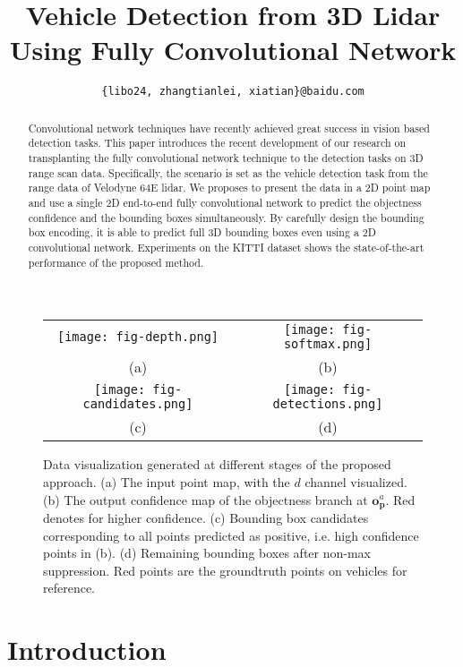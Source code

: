 \documentclass[conference]{IEEEtran}
\title{Vehicle Detection from 3D Lidar Using Fully Convolutional Network}
\author{
\IEEEauthorblockN{Bo Li, Tianlei Zhang and Tian Xia}
\IEEEauthorblockA{Baidu Research – Institute for Deep Learning}
\texttt{\{libo24, zhangtianlei, xiatian\}@baidu.com}}
\begin{document}
\maketitle

\begin{abstract}
Convolutional network techniques have recently achieved great success in vision based detection tasks. This paper introduces the recent development of our research on transplanting the fully convolutional network technique to the detection tasks on 3D range scan data. Specifically, the scenario is set as the vehicle detection task from the range data of Velodyne 64E lidar. We proposes to present the data in a 2D point map and use a single 2D end-to-end fully convolutional network to predict the objectness confidence and the bounding boxes simultaneously. By carefully design the bounding box encoding, it is able to predict full 3D bounding boxes even using a 2D convolutional network. Experiments on the KITTI dataset shows the state-of-the-art performance of the proposed method. 
\end{abstract}

\begin{figure*}
\centering
\begin{tabular}{cc}
\texttt{[image: fig-depth.png]} & \texttt{[image: fig-softmax.png]} \\
(a) & (b) \\
\texttt{[image: fig-candidates.png]} & \texttt{[image: fig-detections.png]} \\
(c) & (d)
\end{tabular}

\caption{Data visualization generated at different stages of the proposed approach. (a) The input point map, with the $d$ channel visualized. (b) The output confidence map of the objectness branch at $\mathbf{o}^a_\mathbf{p}$. Red denotes for higher confidence. (c) Bounding box candidates corresponding to all points predicted as positive, i.e. high confidence points in (b). (d) Remaining bounding boxes after non-max suppression. Red points are the groundtruth points on vehicles for reference. }
\label{fig:pipeline}
\end{figure*}

\section{Introduction}
\end{document}
